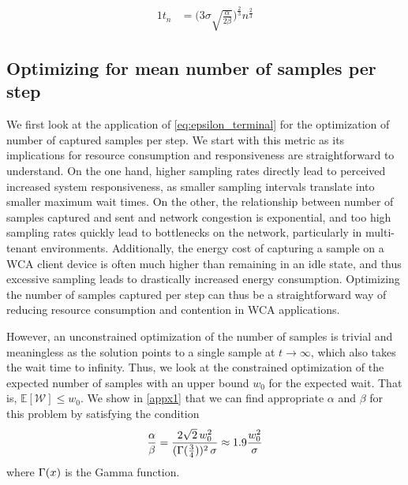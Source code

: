 \begin{alignat}{1}
t_n&=\Big(3\sigma\!\sqrt{\tfrac{\alpha}{2\beta}}\Big)^{\frac{2}{3}}n^{\frac{2}{3}}\label{tn_approx_rayleigh}
\end{alignat}


\subsection{Optimizing for mean number of samples per step}\label{ssec:optimization:samples}

We first look at the application of \cref{eq:epsilon_terminal} for the optimization of number of captured samples per step.
We start with this metric as its implications for resource consumption and responsiveness are straightforward to understand.
On the one hand, higher sampling rates directly lead to perceived increased system responsiveness, as smaller sampling intervals translate into smaller maximum wait times.
On the other, the relationship between number of samples captured and sent and network congestion is exponential, and too high sampling rates quickly lead to bottlenecks on the network, particularly in multi-tenant environments.
Additionally, the energy cost of capturing a sample on a \gls{WCA} client device is often much higher than remaining in an idle state, and thus excessive sampling leads to drastically increased energy consumption.
Optimizing the number of samples captured per step can thus be a straightforward way of reducing resource consumption and contention in \gls{WCA} applications.

However, an unconstrained optimization of the number of samples is trivial and meaningless as the solution points to a single sample at $t\!\rightarrow\!\infty$, which also takes the wait time to infinity.
Thus, we look at the constrained optimization of the expected number of samples with an upper bound $w_0$ for the expected wait.
That is, $\mathbb{E}[\mathcal{W}]\!\leq\!w_0$.
We show in \cref{appx1} that we can find appropriate $\alpha$ and $\beta$ for this problem by satisfying the condition
\begin{alignat}{1}\label{eq:optimization:sampling}
\frac{\alpha}{\beta}=\frac{2\sqrt{2}\,w_0^2}{(\mathlarger{\Gamma}(\tfrac{3}{4}))^2\,\sigma}\approx1.9\frac{w_0^2}{\sigma}
\end{alignat}
where $\mathlarger{\Gamma}(x)$ is the Gamma function.

